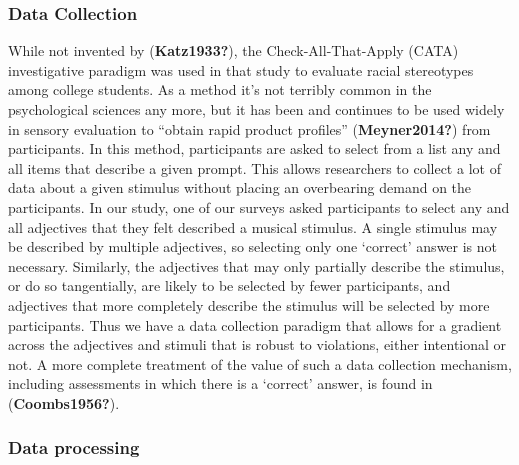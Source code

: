 \documentclass[
  english,
  man,floatsintext]{apa6}
\begin{document}
\hypertarget{data-collection}{%
\subsubsection{Data Collection}\label{data-collection}}

While not invented by (\textbf{Katz1933?}), the Check-All-That-Apply (CATA) investigative paradigm was used in that study to evaluate racial stereotypes among college students. As a method it's not terribly common in the psychological sciences any more, but it has been and continues to be used widely in sensory evaluation to ``obtain rapid product profiles'' (\textbf{Meyner2014?}) from participants. In this method, participants are asked to select from a list any and all items that describe a given prompt. This allows researchers to collect a lot of data about a given stimulus without placing an overbearing demand on the participants. In our study, one of our surveys asked participants to select any and all adjectives that they felt described a musical stimulus. A single stimulus may be described by multiple adjectives, so selecting only one `correct' answer is not necessary. Similarly, the adjectives that may only partially describe the stimulus, or do so tangentially, are likely to be selected by fewer participants, and adjectives that more completely describe the stimulus will be selected by more participants. Thus we have a data collection paradigm that allows for a gradient across the adjectives and stimuli that is robust to violations, either intentional or not. A more complete treatment of the value of such a data collection mechanism, including assessments in which there is a `correct' answer, is found in (\textbf{Coombs1956?}).

\hypertarget{data-processing}{%
\subsubsection{Data processing}\label{data-processing}}
\end{document}
